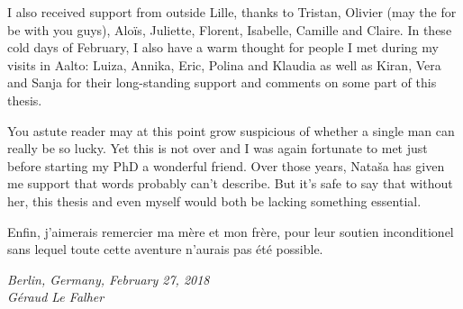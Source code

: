 I also received support from outside Lille, thanks to Tristan, Olivier (may the
for be with you guys), Aloïs, Juliette, Florent, Isabelle, Camille and Claire.
In these cold days of February, I also have a warm thought for people I met
during my visits in Aalto: Luiza, Annika, Eric, Polina and Klaudia as well as
Kiran, Vera and Sanja
for their long-standing support and comments on some part of this thesis.

You astute reader may at this point grow suspicious of whether a single man
can really be so lucky. Yet this is not over and I was again fortunate to met
just before starting my PhD a wonderful friend. Over those years, Nataša has
given me support that words probably can't describe. But it's safe to say that
without her, this thesis and even myself would both be lacking something
essential.

\medskip

\begin{otherlanguage}{french}
Enfin, j'aimerais remercier ma mère et mon frère, pour leur soutien
inconditionel sans lequel toute cette aventure n'aurais pas été possible.
\end{otherlanguage}

\vspace{5\baselineskip}
\begin{flushright}
  {\itshape
    Berlin, Germany, February 27, 2018 \\
    Géraud Le Falher
  }
\end{flushright}
